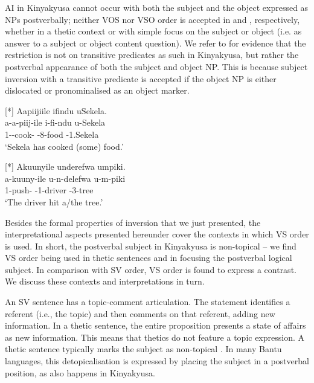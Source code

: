 \documentclass[output=paper]{langscibook}
\begin{document}
\z


AI in Kinyakyusa cannot occur with both the subject and the object expressed as NPs postverbally; neither VOS nor VSO order is accepted in  and , respectively, whether in a thetic context or with simple focus on the subject or object (i.e. as answer to a subject or object content question). We refer to \citet{MsovelaEtAl2023} for evidence that the restriction is not on transitive predicates as such in Kinyakyusa, but rather the postverbal appearance of both the subject and object NP. This is because subject inversion with a transitive predicate is accepted if the object NP is either dislocated or pronominalised as an object marker.

\ea
[*]{
\label{bkm:Ref122427174}
Aapiijiile ifindu uSekela.\\
\gll
a-a-piij-ile  i-fi-ndu  u-Sekela\\
1\SM-\PST{}-cook-\PFV{}  \AUG{}-8-food  \AUG{}-1.Sekela\\
\glt
‘Sekela has cooked (some) food.’ \citep[167]{MsovelaEtAl2023}\\
}

\z


\ea
[*]{
\label{bkm:Ref122427176}
Akuunyile underefwa umpiki.\\
\gll
a-kuuny-ile  u-n-delefwa  u-m-piki\\
1\SM{}-push-\PFV{}  \AUG{}-1-driver  \AUG{}-3-tree\\
\glt
‘The driver hit a/the tree.’ \citep[167]{MsovelaEtAl2023}\\
}

\z


Besides the formal properties of inversion that we just presented, the interpretational aspects presented hereunder cover the contexts in which VS order is used. In short, the postverbal subject in Kinyakyusa is non-topical – we find VS order being used in thetic sentences and in focusing the postverbal logical subject. In comparison with SV order, VS order is found to express a contrast. We discuss these contexts and interpretations in turn.

An SV sentence has a topic-comment articulation. The statement identifies a referent (i.e., the topic) and then comments on that referent, adding new information. In a thetic sentence, the entire proposition presents a state of affairs as new information. This means that thetics do not feature a topic expression. A thetic sentence typically marks the subject as non-topical \citep{Sasse1996,Sasse2006,Lambrecht1994}. In many Bantu languages, this detopicalisation is expressed by placing the subject in a postverbal position, as also happens in Kinyakyusa.
\end{document}
